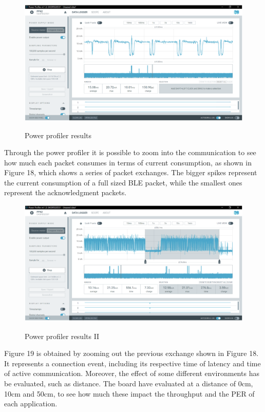\documentclass{Configuration_Files/PoliMi3i_thesis}
\begin{document}
\begin{figure}[H]
    \centering
    \includegraphics[scale=0.7]{Test_Procedure/18.png}
    \label{direct_communication_board_PC_18}
    \caption{Power profiler results}
\end{figure}

Through the power profiler it is possible to zoom into the communication to see how much each packet consumes in terms of current consumption, as shown in Figure 18, which shows a series of packet exchanges. The bigger spikes represent the current consumption of a full sized BLE packet, while the smallest ones represent the acknowledgment packets.

\begin{figure}[H]
    \centering
    \includegraphics[scale=0.7]{Test_Procedure/19.png}
    \label{direct_communication_board_PC_19}
    \caption{Power profiler results II}
\end{figure}

Figure 19 is obtained by zooming out the previous exchange shown in Figure 18. It represents a connection event, including its respective time of latency and time of active communication.
Moreover, the effect of some different environments has be evaluated, such as distance. The board have evaluated at a distance of 0cm, 10cm and 50cm, to see how much these impact the throughput and the PER of each application.
\end{document}
